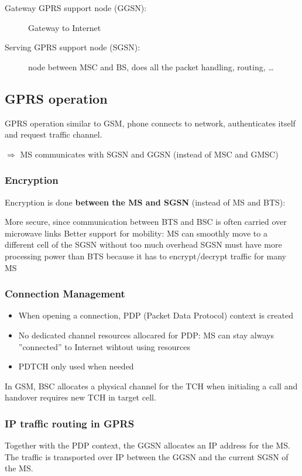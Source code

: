 \begin{description}
	\item[Gateway GPRS support node (GGSN):] Gateway to Internet
	\item[Serving GPRS support node (SGSN):] node between MSC and
	BS, does all the packet handling, routing, \ldots
\end{description}

\subsection{GPRS operation}
GPRS operation similar to GSM, phone connects to network, authenticates itself 
and request traffic channel. 

$\Rightarrow$ MS communicates with SGSN and GGSN (instead
of MSC and GMSC)

 \subsubsection{Encryption}
 Encryption is done \textbf{between the MS and SGSN} (instead of MS and BTS):
 \begin{itemize}
         \proitem{} More secure, since communication between BTS and BSC is often carried 
		over microwave links
		\proitem{} Better support for mobility: MS can smoothly move to a different cell 
		of the SGSN without too much overhead
        \consitem{} SGSN must have more processing power than BTS because it has 
		to encrypt/decrypt traffic for many MS
\end{itemize}

\subsubsection{Connection Management}
\begin{itemize}
	\item When opening a connection, PDP (Packet Data Protocol) context is
	created
	\item No dedicated channel resources allocared for PDP: MS can stay
	always ''connected'' to Internet wihtout using resources
	\item PDTCH only used when needed
\end{itemize}

In GSM, BSC allocates a physical channel for the TCH when initialing a
call and handover requires new TCH in target cell.

\subsubsection{IP traffic routing in GPRS}
Together with the PDP context, the GGSN allocates an IP address for the MS.
The traffic is transported over IP between the GGSN and the current SGSN of
the MS.

